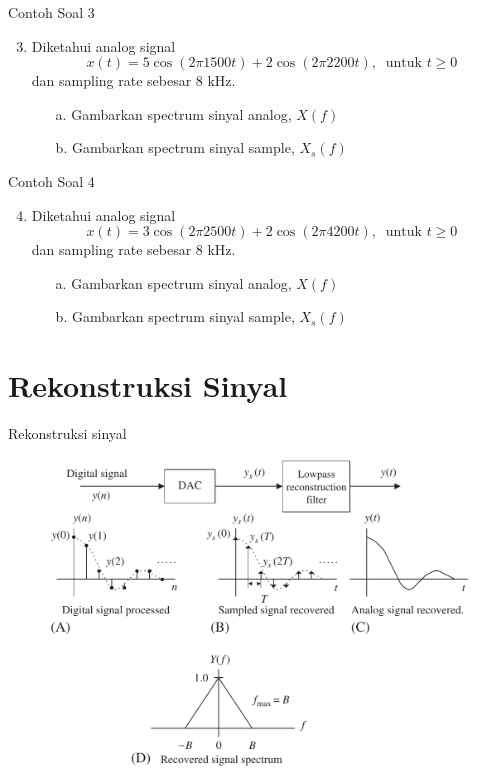\documentclass[pdflatex,compress,mathserif]{beamer}
\begin{document}
\begin{frame}{Contoh Soal 3}
    \begin{enumerate}
        \setcounter{enumi}{2}
        \item Diketahui analog signal
        \begin{equation*}
            x(t) = 5 \cos (2 \pi 1500 t) + 2 \cos (2 \pi 2200 t),~\text{ untuk } t \geq 0
        \end{equation*}
        dan sampling rate sebesar 8 kHz.
        \begin{enumerate}
            \item[a.] Gambarkan spectrum sinyal analog, $X(f)$
            \item[b.] Gambarkan spectrum sinyal sample, $X_s(f)$
        \end{enumerate}
    \end{enumerate}
\end{frame}

\begin{frame}{Contoh Soal 4}
    \begin{enumerate}
        \setcounter{enumi}{3}
        \item Diketahui analog signal
        \begin{equation*}
            x(t) = 3 \cos (2 \pi 2500 t) + 2 \cos (2 \pi 4200 t),~\text{ untuk } t \geq 0
        \end{equation*}
        dan sampling rate sebesar 8 kHz.
        \begin{enumerate}
            \item[a.] Gambarkan spectrum sinyal analog, $X(f)$
            \item[b.] Gambarkan spectrum sinyal sample, $X_s(f)$
        \end{enumerate}
    \end{enumerate}
\end{frame}

\section{Rekonstruksi Sinyal}

\begin{frame}{Rekonstruksi sinyal}
    \begin{figure}
        \includegraphics[width=0.9\linewidth]{img/img14.png}
    \end{figure}
\end{frame}
\end{document}
